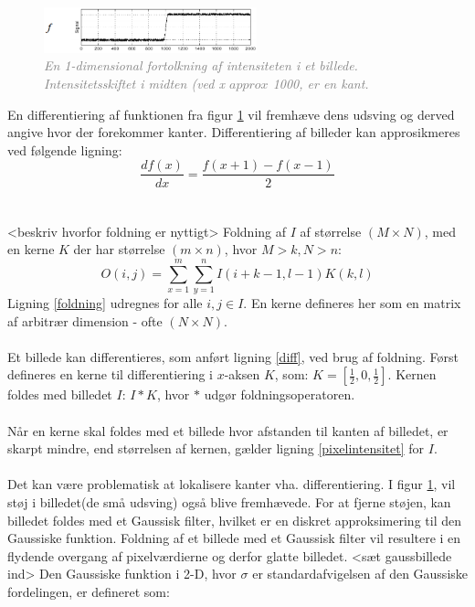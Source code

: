 \noindent
\begin{figure}[H]
    \centering
    \includegraphics[width=0.55\textwidth]{fig/7.png}
     \vspace{-1em}
    \begin{center}        
     \caption{\textcolor{gray}{\footnotesize \textit{
En 1-dimensional fortolkning af intensiteten i et billede. Intensitetsskiftet i midten (ved x $approx$ 1000, er en kant.}}}
    \label{fig:kant}
     \end{center}
       \vspace{-2.5em}
  \end{figure}
\noindent
En differentiering af funktionen fra figur \ref{fig:kant} vil fremhæve dens udsving og derved angive hvor der forekommer kanter. Differentiering af billeder kan approsikmeres ved følgende ligning:
\begin{equation}
\dfrac{df(x)}{dx}=\dfrac{f(x+1)-f(x-1)}{2}
\label{diff}
\end{equation}
\\
\\
<beskriv hvorfor foldning er nyttigt>
Foldning af $I$ af størrelse $(M \times N)$, med en kerne $K$ der har størrelse $(m \times n)$, hvor $M > k, N > n$:
\begin{equation}
O(i,j) = \sum\limits_{x=1}^m \sum\limits_{y=1}^n I(i+k-1,l-1)K(k,l)
\label{foldning}
\end{equation}
Ligning \eqref{foldning} udregnes for alle $i,j \in I$. En kerne defineres her som en matrix af arbitrær dimension - ofte $(N\times N)$. 
\\
\\
Et billede kan differentieres, som anført ligning \eqref{diff}, ved brug af foldning. Først defineres en kerne til differentiering i $x$-aksen $K$, som: $K = [\frac{1}{2}, 0, \frac{1}{2}]$. Kernen foldes med billedet $I$: $I \ast K $, hvor $\ast$ udgør foldningsoperatoren.
\\
\\
Når en kerne skal foldes med et billede hvor afstanden til kanten af billedet, er skarpt mindre, end størrelsen af kernen, gælder ligning \eqref{pixelintensitet} for $I$.
\\
\\
Det kan være problematisk at lokalisere kanter vha. differentiering. I figur \ref{fig:kant}, vil støj i billedet(de små udsving) også blive fremhævede. For at fjerne støjen, kan billedet foldes med et Gaussisk filter, hvilket er en diskret approksimering til den Gaussiske funktion. Foldning af et billede med et Gaussisk filter vil resultere i en flydende overgang af pixelværdierne og derfor glatte billedet. <sæt gaussbillede ind> Den Gaussiske funktion i 2-D, hvor $ \sigma $ er standardafvigelsen af den Gaussiske fordelingen, er defineret som:
